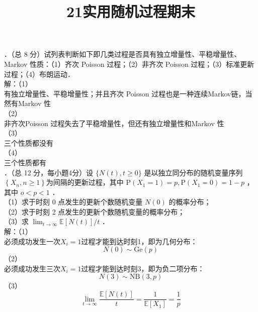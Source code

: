\documentclass[UTF8]{ctexart}
\title{21实用随机过程期末}
\author{\textcalligra{NULIOUS}} %
\date{}
\begin{document}
\maketitle


．（总 8 分）试列表判断如下即几类过程是否具有独立增量性、平稳增量性、Markov 性质：（1）齐次 Poisson 过程；（2）非齐次 Poisson 过程；（3）标准更新过程；（4）布朗运动．\\
解：（1）\\
有独立增量性、平稳增量性；并且齐次 Poisson 过程也是一种连续Markov链，当然有Markov 性\\
（2）\\
非齐次Poisson 过程失去了平稳增量性，但还有独立增量性和Markov 性\\
（3）\\
三个性质都没有\\
（4）\\
三个性质都有\\



．（总 12 分，每小题4分）设 $\{N(t), t \geq 0\}$ 是以独立同分布的随机变量序列 $\left\{X_{n}, n \geq 1\right\}$为间隔的更新过程，其中 $\mathrm{P}\left(X_{1}=1\right)=p, \mathrm{P}\left(X_{1}=0\right)=1-p$ ，其中 $o<p<1$ ．\\
（1）求于时刻 0 点发生的更新个数随机变量 $N(0)$ 的概率分布；\\
（2）求于时刻 2 点发生的更新个数随机变量的概率分布；\\
（3）求 $\lim _{t \rightarrow \infty} \mathbb{E}[N(t)] / t$ ．\\
解：（1）\\
必须成功发生一次$X_i=1$过程才能到达时刻1，即为几何分布：
\[
N(0)\sim \mathrm{Ge}(p)
\]
（2）\\
必须成功发生三次$X_i=1$过程才能到达时刻3，即为负二项分布：
\[
N(3)\sim \mathrm{NB}(3,p)
\]
（3）\\
\[
\lim _{t \rightarrow \infty} \frac{\mathbb{E}[N(t)]}{t}=\frac{1}{\mathbb{E}[X_1]}=\frac{1}{p}
\]\\
\end{document}
